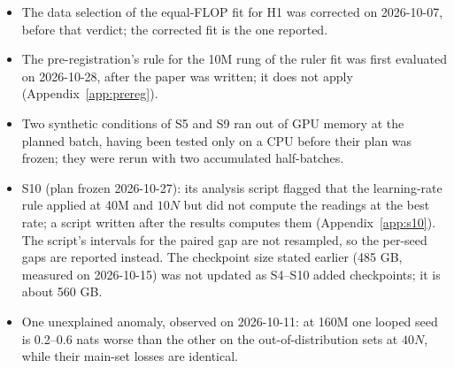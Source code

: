 \begin{itemize}
  compared with gains from other checkpoints (now matched: 2.2--7.4 times the gain); the deployment-FLOP inversion of H4
  had dropped an intercept (the dense model stays optimal); the S3 memory figures had counted the KV cache twice; an extrapolation test of H3 had kept 160M in its training set, and an information criterion for H3, computable only as a
  proxy from the Huber loss, is no longer used as evidence; the set of loop counts behind the \emph{More loops} columns of
  Table~\ref{tab:chain} was widened after the results; and Section~\ref{sec:measurement} had said that a
  difference of 0.01 nats between runs that share a seed is resolvable, which holds only at 40M. The other corrections
  concerned rounded numbers, counts, citations, descriptions and results that had been computed but not reported. On
  2026-10-30 the text was rewritten for readability, with no change to any result.
  \item The data selection of the equal-FLOP fit for H1 was corrected on 2026-10-07, before that verdict; the corrected
  fit is the one reported.
  \item The pre-registration's rule for the 10M rung of the ruler fit was first evaluated on 2026-10-28, after the paper
  was written; it does not apply (Appendix~\ref{app:prereg}).
  \item Two synthetic conditions of S5 and S9 ran out of GPU memory at the planned batch, having been tested only on a CPU
  before their plan was frozen; they were rerun with two accumulated half-batches.
  \item S10 (plan frozen 2026-10-27): its analysis script flagged that the learning-rate rule applied at 40M and $10N$
  but did not compute the readings at the best rate; a script written after the results computes them
  (Appendix~\ref{app:s10}). The script's intervals for the paired gap are not resampled, so the per-seed gaps are
  reported instead. The checkpoint size stated earlier (485 GB, measured on 2026-10-15) was not updated as S4--S10
  added checkpoints; it is about 560 GB.
  \item One unexplained anomaly, observed on 2026-10-11: at 160M one looped seed is 0.2--0.6 nats worse than the other on
  the out-of-distribution sets at $40N$, while their main-set losses are identical.
\end{itemize}
